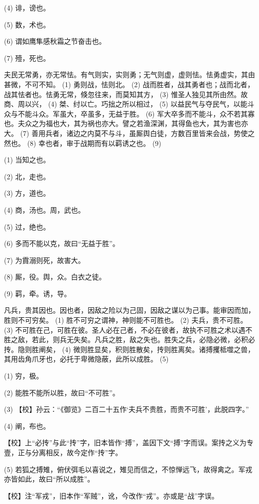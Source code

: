 \documentclass[12pt,UTF8]{ctexbook}
\begin{document}
(4) 诽，谤也。

(5) 数，术也。

(6) 谓如鹰隼感秋霜之节奋击也。

(7) 殪，死也。

夫民无常勇，亦无常怯。有气则实，实则勇；无气则虚，虚则怯。怯勇虚实，其由甚微，不可不知。 (1) 勇则战，怯则北。 (2) 战而胜者，战其勇者也；战而北者，战其怯者也。怯勇无常，倏忽往来，而莫知其方， (3) 惟圣人独见其所由然。故商、周以兴， (4) 桀、纣以亡。巧拙之所以相过， (5) 以益民气与夺民气，以能斗众与不能斗众。军虽大，卒虽多，无益于胜。 (6) 军大卒多而不能斗，众不若其寡也。夫众之为福也大，其为祸也亦大。譬之若渔深渊，其得鱼也大，其为害也亦大。 (7) 善用兵者，诸边之内莫不与斗，虽厮舆白徒，方数百里皆来会战，势使之然也。 (8) 幸也者，审于战期而有以羁诱之也。 (9)

(1) 当知之也。

(2) 北，走也。

(3) 方，道也。

(4) 商，汤也。周，武也。

(5) 过，绝也。

(6) 多而不能以克，故曰“无益于胜”。

(7) 为霣溺则死，故害大。

(8) 厮，役。舆，众。白衣之徒。

(9) 羁，牵。诱，导。

凡兵，贵其因也。因也者，因敌之险以为己固，因敌之谋以为己事。能审因而加，胜则不可穷矣。 (1) 胜不可穷之谓神，神则能不可胜也。 (2) 夫兵，贵不可胜。 (3) 不可胜在己，可胜在彼。圣人必在己者，不必在彼者，故执不可胜之术以遇不胜之敌，若此，则兵无失矣。凡兵之胜，敌之失也。胜失之兵，必隐必微，必积必抟。隐则胜阐矣， (4) 微则胜显矣，积则胜散矣，抟则胜离矣。诸搏攫柢噬之兽，其用齿角爪牙也，必托于卑微隐蔽，此所以成胜。 (5)

(1) 穷，极。

(2) 能胜不能所以胜，故曰“不可胜”。

(3) 【校】孙云：“《御览》二百二十五作‘夫兵不贵胜，而贵不可胜’，此脱四字。”

(4) 阐，布也。

【校】上“必抟”与此“抟”字，旧本皆作“搏”，盖因下文“搏”字而误。案抟之义为专壹，正与分离相反，故今定作“抟”字。

(5) 若狐之搏雉，俯伏弭毛以喜说之，雉见而信之，不惊惮远飞，故得禽之。军戎亦皆如此，故曰“所以成胜”。

【校】注“军戎”，旧本作“军贼”，讹，今改作“戎”。亦或是“战”字误。
\end{document}

